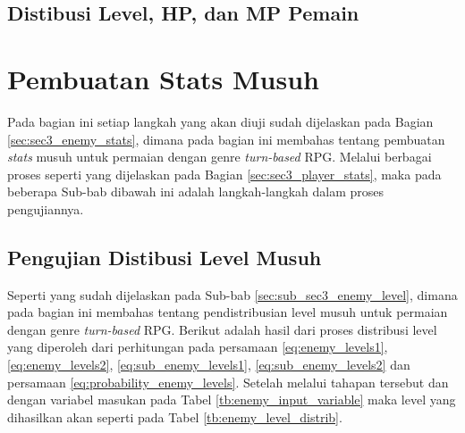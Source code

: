 \subsection{Distibusi Level, HP, dan MP Pemain}
\label{sec:sub_sec4_eval_dist_hp_mp_level_multi-character}
\vspace{1ex}

\section{Pembuatan Stats Musuh}
\label{sec:sec4_eval_turn-based_enemy}
\vspace{1ex}

Pada bagian ini setiap langkah yang akan diuji sudah dijelaskan pada Bagian \ref{sec:sec3_enemy_stats}, dimana pada bagian ini membahas tentang pembuatan \textit{stats} musuh untuk permaian dengan genre \textit{turn-based} RPG. Melalui berbagai proses seperti yang dijelaskan pada Bagian \ref{sec:sec3_player_stats}, maka pada beberapa Sub-bab dibawah ini adalah langkah-langkah dalam proses pengujiannya.
\vspace{1ex}


\subsection{Pengujian Distibusi Level Musuh}
\label{sec:sub_sec4_eval_dist_enemy_level}
\vspace{1ex}

Seperti yang sudah dijelaskan pada Sub-bab \ref{sec:sub_sec3_enemy_level}, dimana pada bagian ini membahas tentang pendistribusian level musuh untuk permaian dengan genre \textit{turn-based} RPG. Berikut adalah hasil dari proses distribusi level yang diperoleh dari perhitungan pada persamaan \ref{eq:enemy_levels1}, \ref{eq:enemy_levels2}, \ref{eq:sub_enemy_levels1}, \ref{eq:sub_enemy_levels2} dan persamaan \ref{eq:probability_enemy_levels}. Setelah melalui tahapan tersebut dan dengan variabel masukan pada Tabel \ref{tb:enemy_input_variable} maka level yang dihasilkan akan seperti pada Tabel \ref{tb:enemy_level_distrib}.

